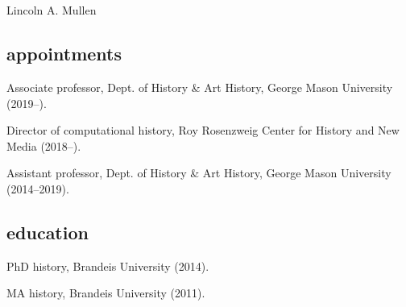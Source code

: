 \documentclass[11pt]{article}
\begin{document}
\thispagestyle{fancy}
\fancyfoot{}
\fancyhead{}
\renewcommand{\headrulewidth}{0pt}

\hfill\hfill\hfill
\hfill\hfill\hfill
\hfill\hfill\hfill
\hfill\hfill\hfill
\begin{minipage}[t]{1.6in}
   \\
   \\
\end{minipage}
\hfill
\begin{minipage}[t]{1.9in}
\end{minipage}

\vspace{0.1in}

{\Large Lincoln A. Mullen}\\[-0.1in]

\subsection{appointments}\label{Appointments}


Associate professor, Dept. of History \& Art History, George Mason University (2019--).

Director of computational history, Roy Rosenzweig Center for History and New Media (2018--).

Assistant professor, Dept. of History \& Art History, George Mason University (2014--2019).

\subsection{education}\label{education}

PhD history, Brandeis University (2014). 

MA history, Brandeis University (2011).
\end{document}
